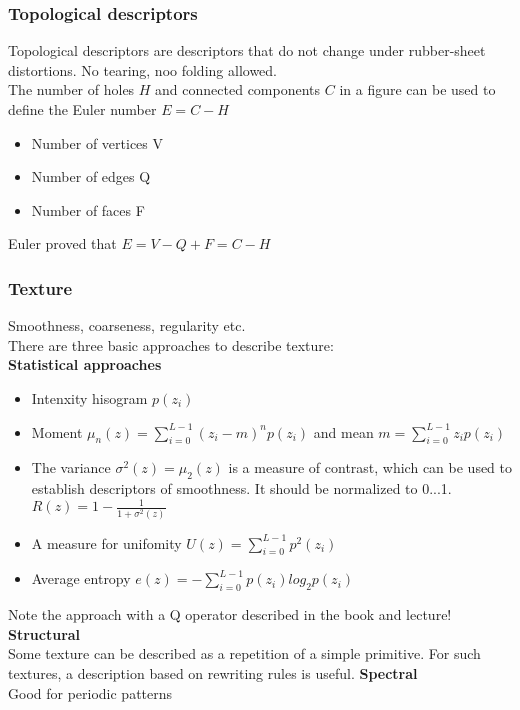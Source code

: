 \subsubsection{Topological descriptors}
Topological descriptors are descriptors that do not change under rubber-sheet distortions. No tearing, noo folding allowed.\\
The number of holes $H$ and connected components $C$ in a figure can be used to define the Euler number $E=C-H$\\
\begin{itemize}
\item Number of vertices V
\item Number of edges Q
\item Number of faces F
\end{itemize}
Euler proved that $E=V-Q+F=C-H$
\subsubsection{Texture}
Smoothness, coarseness, regularity etc.\\
There are three basic approaches to describe texture:\\
\textbf{Statistical approaches}\\
\begin{itemize}
\item Intenxity hisogram $p(z_i)$
\item Moment $\mu_n(z)=\sum\limits_{i=0}^{L-1}(z_i-m)^np(z_i)$ and mean $m=\sum\limits_{i=0}^{L-1}z_ip(z_i)$
\item The variance $\sigma ^2(z) =\mu_2 (z)$ is a measure of contrast, which can be used to establish descriptors of smoothness. It should be normalized to 0...1. $R(z)=1-\frac{1}{1+\sigma ^2(z)}$
\item A measure for unifomity $U(z)=\sum\limits_{i=0}^{L-1}p^2(z_i)$
\item Average entropy $e(z)=-\sum\limits_{i=0}^{L-1}p(z_i)log_2p(z_i)$
\end{itemize}
Note the approach with a Q operator described in the book and lecture!\\
\textbf{Structural}\\
Some texture can be described as a repetition of a simple primitive. For such textures, a description based on rewriting rules is useful.
\textbf{Spectral}\\
Good for periodic patterns\\